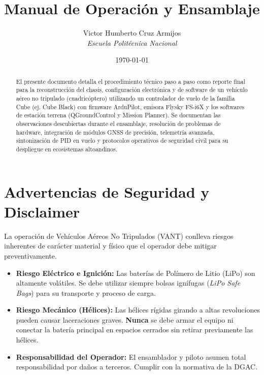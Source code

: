 \documentclass[11pt,a4paper]{article}
\title{\vspace{-2cm}\sffamily\Huge\textbf{Manual de Operación y Ensamblaje}\\\vspace{0.5cm}\Large\color{djilight}{Plataforma Cuadricóptero - Controlador Cube}}
\author{\sffamily Victor Humberto Cruz Armijos \\ \textit{Escuela Politécnica Nacional}}
\date{\sffamily \today}
\begin{document}
\maketitle

\begin{abstract}
El presente documento detalla el procedimiento técnico paso a paso como reporte final para la reconstrucción del chasis, configuración electrónica y de software de un vehículo aéreo no tripulado (cuadricóptero) utilizando un controlador de vuelo de la familia Cube (ej. Cube Black) con firmware ArduPilot, emisora Flysky FS-i6X y los softwares de estación terrena (QGroundControl y Mission Planner). Se documentan las observaciones descubiertas durante el ensamblaje, resolución de problemas de hardware, integración de módulos GNSS de precisión, telemetría avanzada, sintonización de PID en vuelo y protocolos operativos de seguridad civil para su despliegue en ecosistemas altoandinos.
\end{abstract}

\vspace{0.5cm}
\tableofcontents
\newpage

\twocolumn

\section*{Advertencias de Seguridad y Disclaimer}

\begin{warningbox}[title=Precauciones Críticas de Seguridad Operativa]
La operación de Vehículos Aéreos No Tripulados (VANT) conlleva riesgos inherentes de carácter material y físico que el operador debe mitigar preventivamente.
\begin{itemize}[leftmargin=*,noitemsep]
    \item \textbf{Riesgo Eléctrico e Ignición:} Las baterías de Polímero de Litio (LiPo) son altamente volátiles. Se debe utilizar siempre bolsas ignífugas (\textit{LiPo Safe Bags}) para su transporte y proceso de carga.
    \item \textbf{Riesgo Mecánico (Hélices):} Las hélices rígidas girando a altas revoluciones pueden causar laceraciones graves. \textbf{Nunca} se debe armar el equipo ni conectar la batería principal en espacios cerrados sin retirar previamente las hélices.
    \item \textbf{Responsabilidad del Operador:} El ensamblador y piloto asumen total responsabilidad por daños a terceros. Cumplir con la normativa de la DGAC.
\end{itemize}
\end{warningbox}
\end{document}
